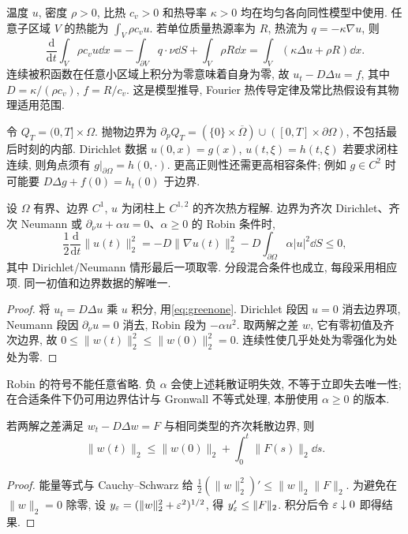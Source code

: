 \label{ch:heatboundary}
温度 $u$, 密度 $\rho>0$, 比热 $c_v>0$ 和热导率 $\kappa>0$ 均在均匀各向同性模型中使用. 任意子区域 $V$ 的热能为 $\int_V\rho c_vu$. 若单位质量热源率为 $R$, 热流为 $q=-\kappa\nabla u$, 则
\[
\frac{\mathrm d}{\mathrm dt}\int_V\rho c_vu\dd x
=-\int_{\partial V}q\cdot\nu\dd S+\int_V\rho R\dd x
=\int_V(\kappa\Delta u+\rho R)\dd x.
\]
连续被积函数在任意小区域上积分为零意味着自身为零, 故 $u_t-D\Delta u=f$, 其中 $D=\kappa/(\rho c_v)$, $f=R/c_v$. 这是模型推导, Fourier 热传导定律及常比热假设有其物理适用范围.

令 $Q_T=(0,T]\times\Omega$. 抛物边界为 $\partial_pQ_T=(\{0\}\times\overline\Omega)\cup([0,T]\times\partial\Omega)$, 不包括最后时刻的内部. Dirichlet 数据 $u(0,x)=g(x)$, $u(t,\xi)=h(t,\xi)$ 若要求闭柱连续, 则角点须有 $g|_{\partial\Omega}=h(0,\cdot)$. 更高正则性还需更高相容条件; 例如 $g\in C^2$ 时可能要 $D\Delta g+f(0)=h_t(0)$ 于边界.
\begin{theorem}\label{thm:heatenergy}
设 $\Omega$ 有界、边界 $C^1$, $u$ 为闭柱上 $C^{1,2}$ 的齐次热方程解. 边界为齐次 Dirichlet、齐次 Neumann 或 $\partial_\nu u+\alpha u=0$、$\alpha\ge0$ 的 Robin 条件时,
\[
\frac12\frac{\mathrm d}{\mathrm dt}\|u(t)\|_2^2
=-D\|\nabla u(t)\|_2^2-D\int_{\partial\Omega}\alpha|u|^2\dd S\le0,
\]
其中 Dirichlet/Neumann 情形最后一项取零. 分段混合条件也成立, 每段采用相应项. 同一初值和边界数据的解唯一.
\end{theorem}
\begin{proof}
将 $u_t=D\Delta u$ 乘 $u$ 积分, 用\eqref{eq:greenone}. Dirichlet 段因 $u=0$ 消去边界项, Neumann 段因 $\partial_\nu u=0$ 消去, Robin 段为 $-\alpha u^2$. 取两解之差 $w$, 它有零初值及齐次边界, 故 $0\le\|w(t)\|_2^2\le\|w(0)\|_2^2=0$. 连续性使几乎处处为零强化为处处为零.
\end{proof}
Robin 的符号不能任意省略. 负 $\alpha$ 会使上述耗散证明失效, 不等于立即失去唯一性; 在合适条件下仍可用边界估计与 Gronwall 不等式处理, 本册使用 $\alpha\ge0$ 的版本.
\begin{proposition}\label{prop:heatl2stable}
若两解之差满足 $w_t-D\Delta w=F$ 与相同类型的齐次耗散边界, 则
\[
\|w(t)\|_2\le\|w(0)\|_2+\int_0^t\|F(s)\|_2\dd s.
\]
\end{proposition}
\begin{proof}
能量等式与 Cauchy--Schwarz 给 $\frac12(\|w\|_2^2)'\le\|w\|_2\|F\|_2$. 为避免在 $\|w\|_2=0$ 除零, 设 $y_\varepsilon=(\|w\|_2^2+\varepsilon^2)^{1/2}$, 得 $y_\varepsilon'\le\|F\|_2$. 积分后令 $\varepsilon\downarrow0$ 即得结果.
\end{proof}
